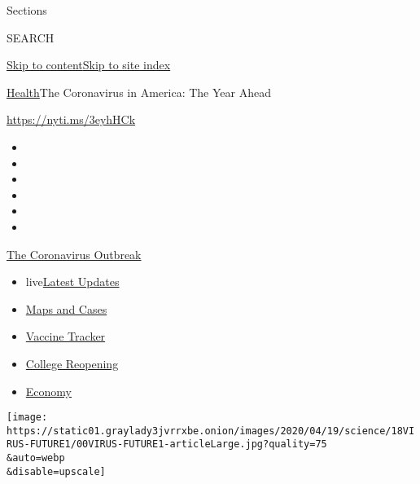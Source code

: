 Sections

SEARCH

\protect\hyperlink{site-content}{Skip to
content}\protect\hyperlink{site-index}{Skip to site index}

\href{/section/health}{Health}\textbar{}The Coronavirus in America: The
Year Ahead

\url{https://nyti.ms/3eyhHCk}

\begin{itemize}
\item
\item
\item
\item
\item
\item
\end{itemize}

\href{https://www.nytimes3xbfgragh.onion/news-event/coronavirus?action=click\&pgtype=Article\&state=default\&region=TOP_BANNER\&context=storylines_menu}{The
Coronavirus Outbreak}

\begin{itemize}
\tightlist
\item
  live\href{https://www.nytimes3xbfgragh.onion/2020/08/04/world/coronavirus-cases.html?action=click\&pgtype=Article\&state=default\&region=TOP_BANNER\&context=storylines_menu}{Latest
  Updates}
\item
  \href{https://www.nytimes3xbfgragh.onion/interactive/2020/us/coronavirus-us-cases.html?action=click\&pgtype=Article\&state=default\&region=TOP_BANNER\&context=storylines_menu}{Maps
  and Cases}
\item
  \href{https://www.nytimes3xbfgragh.onion/interactive/2020/science/coronavirus-vaccine-tracker.html?action=click\&pgtype=Article\&state=default\&region=TOP_BANNER\&context=storylines_menu}{Vaccine
  Tracker}
\item
  \href{https://www.nytimes3xbfgragh.onion/2020/08/02/us/covid-college-reopening.html?action=click\&pgtype=Article\&state=default\&region=TOP_BANNER\&context=storylines_menu}{College
  Reopening}
\item
  \href{https://www.nytimes3xbfgragh.onion/live/2020/08/04/business/stock-market-today-coronavirus?action=click\&pgtype=Article\&state=default\&region=TOP_BANNER\&context=storylines_menu}{Economy}
\end{itemize}

\texttt{[image: https://static01.graylady3jvrrxbe.onion/images/2020/04/19/science/18VIRUS-FUTURE1/00VIRUS-FUTURE1-articleLarge.jpg?quality=75\\\&auto=webp\\\&disable=upscale]}

